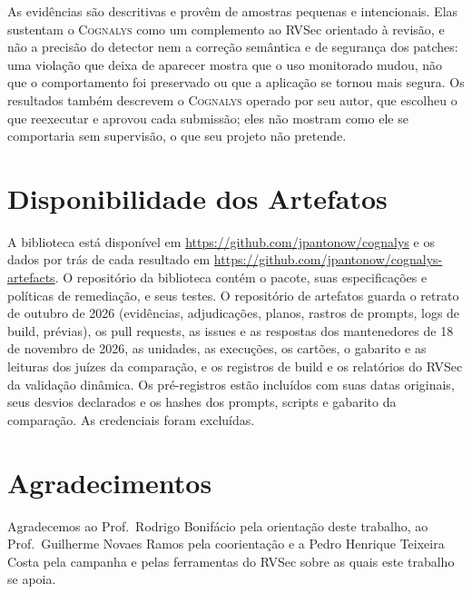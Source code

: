 \documentclass[conference]{IEEEtran}
\newcommand{\system}{\textsc{Cognalys}}
\begin{document}
As evidências são descritivas e provêm de amostras pequenas e intencionais. Elas
sustentam o \system{} como um complemento ao RVSec orientado à revisão, e não a precisão
do detector nem a correção semântica e de segurança dos patches: uma violação que deixa
de aparecer mostra que o uso monitorado mudou, não que o comportamento foi preservado ou
que a aplicação se tornou mais segura. Os resultados também descrevem o \system{} operado
por seu autor, que escolheu o que reexecutar e aprovou cada submissão; eles não mostram
como ele se comportaria sem supervisão, o que seu projeto não pretende.

\section*{Disponibilidade dos Artefatos}

A biblioteca está disponível em \url{https://github.com/jpantonow/cognalys} e os
dados por trás de cada resultado em \url{https://github.com/jpantonow/cognalys-artefacts}. O repositório da
biblioteca contém o pacote, suas especificações e políticas de remediação, e seus
testes. O repositório de artefatos guarda o retrato de outubro de 2026 (evidências,
adjudicações, planos, rastros de prompts, logs de build, prévias), os pull requests, as
issues e as respostas dos mantenedores de 18 de novembro de 2026, as unidades, as
execuções, os cartões, o gabarito e as leituras dos juízes da comparação, e os registros de build e
os relatórios do RVSec da validação dinâmica. Os pré-registros estão incluídos com suas
datas originais, seus desvios declarados e os hashes dos prompts, scripts e gabarito da
comparação. As credenciais foram excluídas.

\section*{Agradecimentos}

Agradecemos ao Prof.\ Rodrigo Bonifácio pela orientação deste trabalho, ao
Prof.\ Guilherme Novaes Ramos pela coorientação e a Pedro Henrique Teixeira Costa
pela campanha e pelas ferramentas do RVSec sobre as quais este trabalho se apoia.



\end{document}
